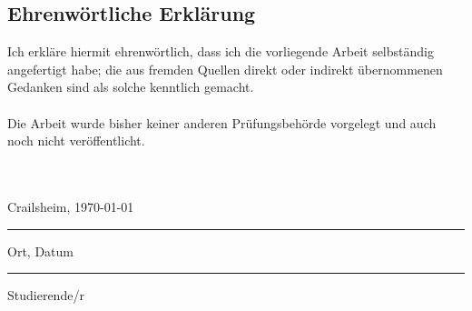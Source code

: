 \newpage

\subsection*{Ehrenwörtliche Erklärung}

Ich erkläre hiermit ehrenwörtlich, dass ich die vorliegende Arbeit selbständig angefertigt habe; die aus fremden Quellen direkt oder indirekt übernommenen Gedanken sind als solche kenntlich gemacht.\\ \\ 
Die Arbeit wurde bisher keiner anderen Prüfungsbehörde vorgelegt und auch noch nicht veröffentlicht.
\\ \\ \\
\parbox[t][][t]{5.5cm}{\centering Crailsheim, \today \hrule
\strut \centering\footnotesize Ort, Datum} \hfill
\parbox[t][][t]{5cm}{\hrule\strut \centering\footnotesize Studierende/r}
